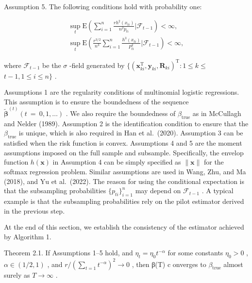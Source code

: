 \documentclass[
  10
]{article}
\begin{document}
Assumption 5. The following conditions hold with probability one:

\[
\begin{array} { l } { \displaystyle \operatorname* { s u p } _ { t } \mathrm { E } \left( \sum _ { i = 1 } ^ { n } \frac { r h ^ { 2 } ( x _ { t i } ) } { n ^ { 2 } \dot { p } _ { t i } } \bigg | \mathcal { F } _ { t - 1 } \right) < \infty , } \\ { \displaystyle \operatorname* { s u p } _ { t } \mathrm { E } \left( \frac { r ^ { 3 / 2 } } { n ^ { 3 } } \sum _ { i = 1 } ^ { n } \frac { h ^ { 3 } ( x _ { t i } ) } { { P } _ { t i } ^ { 2 } } \bigg | \mathcal { F } _ { t - 1 } \right) < \infty , } \end{array}
\]

where \(\mathcal { F } _ { t - 1 }\) be the \(\sigma\) -field generated
by
\(\{ ( \boldsymbol { x } _ { k i } ^ { \mathrm { T } } , \boldsymbol { y } _ { k i } , \boldsymbol { R } _ { k i } ) ^ { \mathrm { T } } : 1 \leq k \leq\)
\(t - 1 , 1 \leq i \leq n \}\) .

Assumptions 1 are the regularity conditions of multinomial logistic
regressions. This assumption is to ensure the boundedness of the
sequence
\(\tilde { \pmb { \beta } } ^ { ( t ) } ( t \ = \ 0 , 1 , \ldots )\) .
We also require the boundedness of
\(\beta _ { \mathrm { { t r u e } } }\) as in McCullagh and Nelder
(1989). Assumption 2 is the identification condition to ensure that the
\(\beta _ { \mathrm { t r u e } }\) is unique, which is also required in
Han et al.~(2020). Assumption 3 can be satisfied when the risk function
is convex. Assumptions 4 and 5 are the moment assumptions imposed on the
full sample and subsample. Specifically, the envelop function
\(h ( \pmb { x } )\) in Assumption 4 can be simply specified as
\(\| \pmb { x } \|\) for the softmax regression problem. Similar
assumptions are used in Wang, Zhu, and Ma (2018), and
\(\mathrm { Y u }\) et al.~(2022). The reason for using the conditional
expectation is that the subsampling probabilities
\(\{ { p } _ { t i } \} _ { i = 1 } ^ { n }\) may depend on
\(\mathcal { F } _ { t - 1 }\) . A typical example is that the
subsampling probabilities rely on the pilot estimator derived in the
previous step.

At the end of this section, we establish the consistency of the
estimator achieved by Algorithm 1.

Theorem 2.1. If Assumptions 1--5 hold, and
\(\eta _ { t } = \eta _ { 0 } t ^ { - \alpha }\) for some constants
\(\eta _ { 0 } > 0\) , \(\alpha \in ( 1 / 2 , 1 )\) , and
\(r / ( \sum _ { t = 1 } t ^ { - \alpha } ) ^ { 2 } \to 0\) , then β(T)
c onverges to \(\beta _ { \mathrm { { t r u e } } }\) almost surely as
\(T \to \infty\) .
\end{document}
